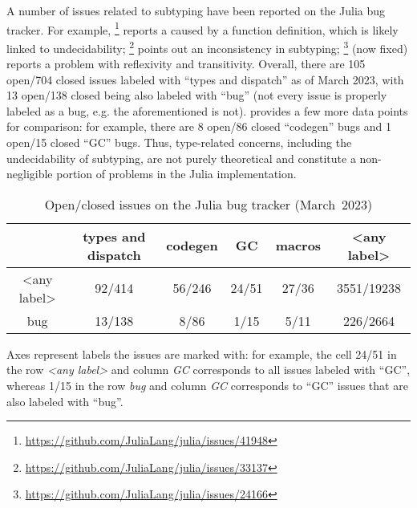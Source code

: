 A number of issues related to subtyping have been reported
on the Julia bug tracker. For example,
\href{https://github.com/JuliaLang/julia/issues/41948}{}\footnote{
    \url{https://github.com/JuliaLang/julia/issues/41948}
} reports a  caused by a function definition,
which is likely linked to undecidability;
\href{https://github.com/JuliaLang/julia/issues/33137}{}\footnote{
    \url{https://github.com/JuliaLang/julia/issues/33137}
} points out an inconsistency in subtyping; %
\href{https://github.com/JuliaLang/julia/issues/24166}{}\footnote{
    \url{https://github.com/JuliaLang/julia/issues/24166} 
} (now fixed) reports a problem with reflexivity and transitivity.
Overall, there are 105 open/704 closed issues labeled with ``types and
dispatch'' as of March 2023,
with 13 open/138 closed being also labeled with ``bug''
(not every issue is properly labeled as a bug,
e.g. the aforementioned
\href{https://github.com/JuliaLang/julia/issues/24166}{} is not).
 provides a few more data points for comparison:
for example, there are 8 open/86 closed ``codegen'' bugs
and 1 open/15 closed ``GC'' bugs.
Thus, type-related concerns, including the undecidability of subtyping,
are not purely theoretical and
constitute a non-negligible portion of problems in the Julia implementation.

\begin{table}[t]
\begin{threeparttable}
\centering\footnotesize
\begin{tabular}{c|ccccc}
 & types and dispatch & codegen & GC & macros & <any label> \\
\midrule
<any label> &
  92/414 & 56/246 & 24/51 & 27/36 & 3551/19238 \\
bug &
  13/138 & 8/86 & 1/15 & 5/11 & 226/2664
\end{tabular}
\caption{Open/closed issues on the Julia bug tracker
(March~2023)}\label{tab:julia-issues-stats}
\begin{tablenotes}[para]
\small
Axes represent labels the issues are marked with: for example, the cell
24/51 in the row \emph{<any label>} and column \emph{GC} corresponds to all
issues labeled with {``GC''}, whereas 1/15 in the row \emph{bug} and column 
\emph{GC} corresponds to {``GC''} issues that are also labeled with {``bug''}.
\end{tablenotes}
\end{threeparttable}
\end{table}

